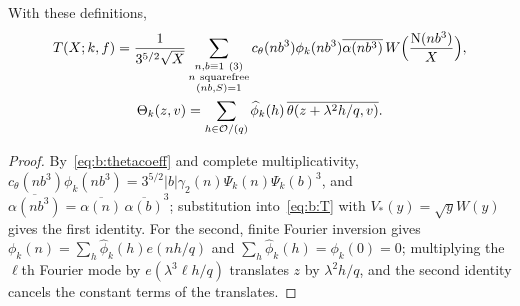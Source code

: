 \begin{lemma}\label{lem:b:realization}
With these definitions,
\begin{equation}\label{eq:b:Ttheta}
  \begin{gathered}
  T(X;k,f)=\frac1{3^{5/2}\sqrt X}\sum_{\substack{n,b\equiv1\ (3)\\n\ {\rm squarefree}\\(nb,S)=1}}c_\theta(nb^3)\phi_k(nb^3)\overline{\alpha(nb^3)}\,W\Bigl(\frac{\NK(nb^3)}X\Bigr),\\
  \Theta_k(z,v)=\sum_{h\in\OO/(q)}\widehat\phi_k(h)\,\overline{\theta(z+\lambda^2h/q,v)}.
  \end{gathered}
\end{equation}
\end{lemma}

\begin{proof}
By~\eqref{eq:b:thetacoeff} and complete multiplicativity, $c_\theta(nb^3)\phi_k(nb^3)=3^{5/2}|b|\gamma_2(n)\Psi_k(n)\Psi_k(b)^3$, and $\overline{\alpha(nb^3)}=\overline{\alpha(n)}\,\overline{\alpha(b)}^3$; substitution into~\eqref{eq:b:T} with $V_*(y)=\sqrt yW(y)$ gives the first identity. For the second, finite Fourier inversion gives $\phi_k(n)=\sum_h\widehat\phi_k(h)e(nh/q)$ and $\sum_h\widehat\phi_k(h)=\phi_k(0)=0$; multiplying the $\ell$th Fourier mode by $e(\lambda^3\ell h/q)$ translates $z$ by $\lambda^2h/q$, and the second identity cancels the constant terms of the translates.
\end{proof}

